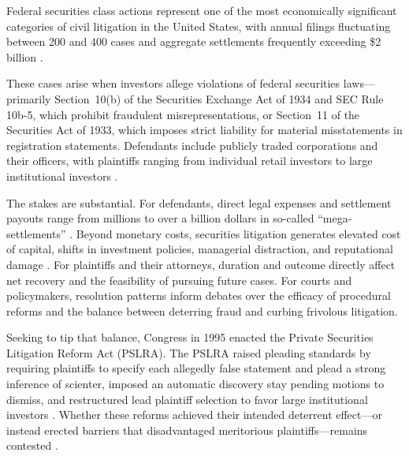 Federal securities class actions represent one of the most
economically significant categories of civil litigation in the
United States, with annual filings fluctuating between 200 and
400 cases and aggregate settlements frequently exceeding \$2
billion \citep{cornerstone2024, nera2024}. 

These cases arise when investors allege violations of federal
securities laws---primarily Section~10(b) of the Securities
Exchange Act of 1934 and SEC Rule 10b-5, which prohibit
fraudulent misrepresentations, or Section~11 of the Securities
Act of 1933, which imposes strict liability for material
misstatements in registration statements. Defendants include
publicly traded corporations and their officers, with plaintiffs
ranging from individual retail investors to large institutional
investors \citep{cox2008, cheng2010}.

The stakes are substantial. For defendants, direct legal
expenses and settlement payouts range from millions to over a
billion dollars in so-called ``mega-settlements''
\citep{cornerstone2024}. Beyond monetary costs, securities
litigation generates elevated cost of capital, shifts in
investment policies, managerial distraction, and reputational
damage \citep{karpoff2008, graham2008}. For plaintiffs and their
attorneys, duration and outcome directly affect net recovery and
the feasibility of pursuing future cases. For courts and
policymakers, resolution patterns inform debates over the
efficacy of procedural reforms and the balance between deterring
fraud and curbing frivolous litigation.

Seeking to tip that balance, Congress in 1995 enacted the Private
Securities Litigation Reform Act (PSLRA). The PSLRA raised pleading standards by requiring
plaintiffs to specify each allegedly false statement and plead a
strong inference of scienter, imposed an automatic
discovery stay pending motions to dismiss, and restructured lead
plaintiff selection to favor large institutional investors
\citep{perino2003, choi2007}. Whether these reforms achieved their
intended deterrent effect---or instead erected barriers that
disadvantaged meritorious plaintiffs---remains contested
\citep{choi2007}.

